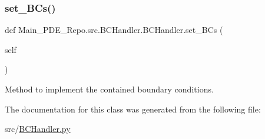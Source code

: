 \subsubsection{\texorpdfstring{set\+\_\+\+B\+Cs()}{set\_BCs()}}
{\footnotesize\ttfamily def Main\+\_\+\+P\+D\+E\+\_\+\+Repo.\+src.\+B\+C\+Handler.\+B\+C\+Handler.\+set\+\_\+\+B\+Cs (\begin{DoxyParamCaption}\item[{}]{self }\end{DoxyParamCaption})}



Method to implement the contained boundary conditions. 



The documentation for this class was generated from the following file\+:\begin{DoxyCompactItemize}
\item 
src/\hyperlink{BCHandler_8py}{B\+C\+Handler.\+py}\end{DoxyCompactItemize}
